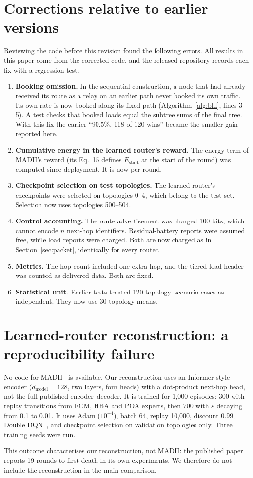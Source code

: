 \appendices
\section{Corrections relative to earlier versions}\label{app:corrections}
Reviewing the code before this revision found the following errors. All results in this paper come from the corrected code, and the released repository records each fix with a regression test.
\begin{enumerate}[label=(\alph*), leftmargin=*]
  \item \textbf{Booking omission.} In the sequential construction, a node that had already received its route as a relay on an earlier path never booked its own traffic. Its own rate is now booked along its fixed path (Algorithm~\ref{alg:bld}, lines 3--5). A test checks that booked loads equal the subtree sums of the final tree. With this fix the earlier ``90.5\%, 118 of 120 wins'' became the smaller gain reported here.
  \item \textbf{Cumulative energy in the learned router's reward.} The energy term of MADII's reward (its Eq.~15 defines $E_{\mathrm{start}}$ at the start of the round) was computed since deployment. It is now per round.
  \item \textbf{Checkpoint selection on test topologies.} The learned router's checkpoints were selected on topologies 0--4, which belong to the test set. Selection now uses topologies 500--504.
  \item \textbf{Control accounting.} The route advertisement was charged 100 bits, which cannot encode $n$ next-hop identifiers. Residual-battery reports were assumed free, while load reports were charged. Both are now charged as in Section~\ref{sec:packet}, identically for every router.
  \item \textbf{Metrics.} The hop count included one extra hop, and the tiered-load header was counted as delivered data. Both are fixed.
  \item \textbf{Statistical unit.} Earlier tests treated 120 topology--scenario cases as independent. They now use 30 topology means.
\end{enumerate}

\section{Learned-router reconstruction: a reproducibility failure}\label{app:madii}
No code for MADII~\cite{yang2025madii} is available. Our reconstruction uses an Informer-style encoder ($d_{\mathrm{model}}=128$, two layers, four heads) with a dot-product next-hop head, not the full published encoder--decoder. It is trained for 1{,}000 episodes: 300 with replay transitions from FCM, HBA and POA experts, then 700 with $\varepsilon$ decaying from 0.1 to 0.01. It uses Adam ($10^{-4}$), batch 64, replay 10{,}000, discount 0.99, Double DQN~\cite{vanhasselt2016double}, and checkpoint selection on validation topologies only. Three training seeds were run. 

This outcome characterises our reconstruction, not MADII: the published paper reports 19 rounds to first death in its own experiments. We therefore do not include the reconstruction in the main comparison.
